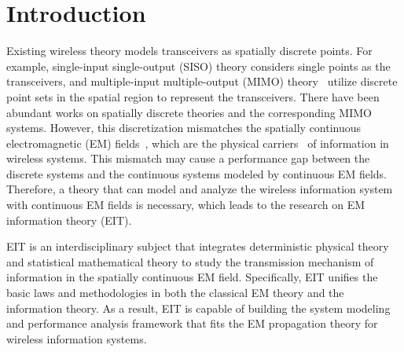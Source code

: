 \documentclass[journal,twocolumn]{IEEEtran}
\begin{document}
\section{Introduction}
Existing wireless theory models transceivers as spatially discrete points. For example, single-input single-output (SISO) theory considers single points as the transceivers, and multiple-input multiple-output (MIMO) theory~\cite{goldsmith2003capacity} utilize discrete point sets in the spatial region to represent the transceivers. 
There have been abundant works on spatially discrete theories and the corresponding MIMO systems. 
However, this discretization mismatches the spatially continuous electromagnetic (EM) fields~\cite{huang2020holographic}, which are the physical carriers~\cite{migliore2018horse} of information in wireless systems. 
This mismatch may cause a performance gap between the discrete systems and the continuous systems modeled by continuous EM fields. 
Therefore, a theory that can model and analyze the wireless information system with continuous EM fields is necessary, which leads to the research on EM information theory (EIT).

EIT is an interdisciplinary subject that integrates deterministic physical theory and statistical mathematical theory to study the transmission mechanism of information in the spatially continuous EM field. 
Specifically, EIT unifies the basic laws and methodologies in both the classical EM theory and the information theory. 
As a result, EIT is capable of building the system modeling and performance analysis framework that fits the EM propagation theory for wireless information systems. 
\end{document}

